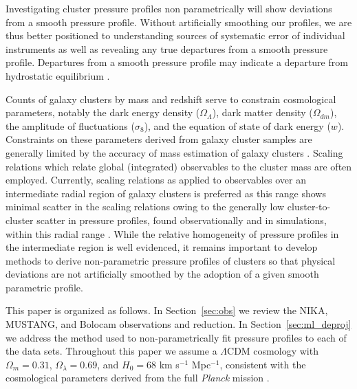 \documentclass[twocolumn,traditabstract]{aa}
\begin{document}
Investigating cluster pressure profiles non parametrically will show deviations from a smooth pressure profile.
Without artificially smoothing our profiles, we are thus better positioned to understanding sources of systematic error
of individual instruments as well as revealing any true departures from a smooth pressure profile. Departures from a
smooth pressure profile may indicate a departure from hydrostatic equilibrium \citep{basu2010}.

Counts of galaxy clusters by mass and redshift serve to constrain cosmological parameters, notably the dark energy density
($\Omega_{\Lambda}$), dark matter density ($\Omega_{dm}$), the amplitude of fluctuations ($\sigma_8$),
and the equation of state of dark energy ($w$). Constraints on these
parameters derived from galaxy cluster samples are generally limited by the accuracy of mass estimation of 
galaxy clusters \citep[e.g.][]{hasselfield2013, reichardt2013}. Scaling relations which relate global (integrated) observables
to the cluster mass are often employed. Currently, scaling relations as applied to observables over an intermediate radial
region of galaxy clusters is preferred as this range shows minimal scatter in the scaling relations \citep[e.g.][]{kravtsov2012}
owing to the generally low cluster-to-cluster scatter in pressure profiles, found observationally and in simulations,
within this radial range \citep[e.g.][]{borgani2004,nagai2007,arnaud2010,bonamente2012,planck2013a,sayers2013}.
While the relative homogeneity of pressure profiles in the intermediate region is well evidenced, it remains important to
develop methods to derive non-parametric pressure profiles of clusters so that physical deviations are not artificially
smoothed by the adoption of a given smooth parametric profile. 

This paper is organized as follows. In Section~\ref{sec:obs} we review the NIKA, MUSTANG, and Bolocam observations and reduction. 
In Section~\ref{sec:ml_deproj} we address the method used to non-parametrically fit pressure profiles to each of the data sets.
Throughout this paper we assume a $\Lambda$CDM cosmology with $\Omega_m = 0.31$, $\Omega_{\lambda} = 0.69$, and $H_0 = 68$ 
km s$^{-1}$ Mpc$^{-1}$, consistent with the cosmological parameters derived from the full \emph{Planck} mission
\citep{planck2016_cp}.
\end{document}
